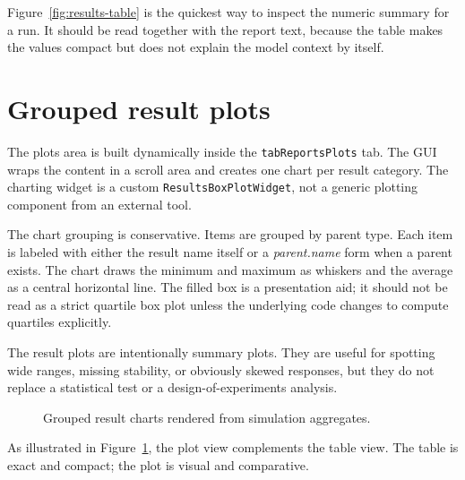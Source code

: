 Figure~\ref{fig:results-table} is the quickest way to inspect the numeric
summary for a run. It should be read together with the report text, because the
table makes the values compact but does not explain the model context by itself.

\section{Grouped result plots}
\label{sec:results-plots}

The plots area is built dynamically inside the \texttt{tabReportsPlots} tab.
The GUI wraps the content in a scroll area and creates one chart per result
category. The charting widget is a custom \texttt{ResultsBoxPlotWidget}, not a
generic plotting component from an external tool.

The chart grouping is conservative. Items are grouped by parent type. Each item
is labeled with either the result name itself or a \textit{parent.name} form
when a parent exists. The chart draws the minimum and maximum as whiskers and
the average as a central horizontal line. The filled box is a presentation aid;
it should not be read as a strict quartile box plot unless the underlying code
changes to compute quartiles explicitly.

The result plots are intentionally summary plots. They are useful for spotting
wide ranges, missing stability, or obviously skewed responses, but they do not
replace a statistical test or a design-of-experiments analysis.

\begin{figure}[htbp]
\centering
\caption{Grouped result charts rendered from simulation aggregates.}
\label{fig:results-plots}
\end{figure}

As illustrated in Figure~\ref{fig:results-plots}, the plot view complements the
table view. The table is exact and compact; the plot is visual and comparative.

